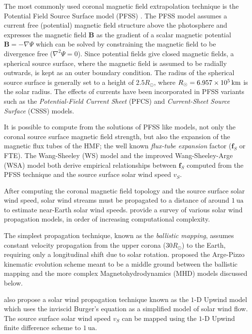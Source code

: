 The most commonly used coronal magnetic field extrapolation technique is the Potential Field Source 
Surface model (PFSS) \citep{altschuler1969magnetic,schatten1969model}. The PFSS model assumes a 
current free (potential) magnetic field structure above the photosphere and expresses the magnetic 
field $\mathbf{B}$ as the gradient of a scalar magnetic potential $\mathbf{B} = -\nabla \Psi$ which 
can be solved by constraining the magnetic field to be divergence free ($\nabla^{2}\Psi = 0$). 
Since potential fields give closed magnetic fields, a spherical source surface, where the magnetic 
field is assumed to be radially outwards, is kept as an outer boundary condition. The radius of the 
spherical source surface is generally set to a height of 
$2.5 R_{\odot}$, where $R_{\odot} = \SI{6.957d5}{\kilo\metre}$ is the solar radius. The effects of 
currents have been incorporated in PFSS variants such as the \emph{Potential-Field Current Sheet} 
(PFCS) \citep{schatten1971current} and \emph{Current-Sheet Source Surface} (CSSS) \citep{csss} 
models. 

It is possible to compute from the solutions of PFSS like models, not only the coronal source 
surface magnetic field strength, but also the expansion of the magnetic flux tubes of the HMF; 
the well known \emph{flux-tube expansion} factor ($\mathbf{f}_S$ or FTE). The Wang-Sheeley (WS) 
model \citep{WSAModel} and the improved Wang-Sheeley-Arge (WSA) model 
\citep{arge2000improvement,arge2004stream} both derive empirical relationships between 
$\mathbf{f}_S$ computed from the PFSS technique and the source surface solar wind speed $v_S$.  

After computing the coronal magnetic field topology and the source surface solar wind speed, 
solar wind streams must be propagated to a distance of around $\SI{1}{\astronomicalunit}$ to 
estimate near-Earth solar wind speeds. \citet{Riley2011} provide a survey of various solar wind 
propagation models, in order of increasing computational complexity. 

The simplest propagation technique, known as the \emph{ballistic mapping}, assumes constant 
velocity propagation from the upper corona ($30R_{\odot}$) to the Earth, requiring only a 
longitudinal shift due to solar rotation. \citet{arge2000improvement} proposed the Arge-Pizzo 
kinematic evolution scheme meant to be a middle ground between the ballistic mapping and the more 
complex Magnetohydrodynamics (MHD) models discussed below.

\citet{Riley2011} also propose a solar wind propagation technique known as the 
$1\textrm{-}\text{D}$ Upwind model which uses the inviscid Burger's equation as a simplified model 
of solar wind flow. The source surface solar wind speed $v_S$ can be mapped using the 
$1\textrm{-}\text{D}$ Upwind finite difference scheme to $\SI{1}{\astronomicalunit}$.

